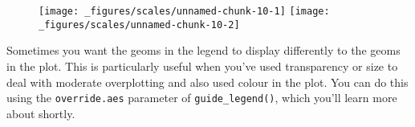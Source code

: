 \begin{Shaded}
\begin{Highlighting}[]
\OperatorTok{+}\StringTok{ }
\StringTok{  }\NormalTok{(} \NormalTok{, } \NormalTok{) }\OperatorTok{+}
\StringTok{  }\NormalTok{(}\NormalTok{(} \NormalTok{) }
\OperatorTok{+}\StringTok{ }
\StringTok{  }\NormalTok{(} \NormalTok{, } \NormalTok{, } \NormalTok{) }\OperatorTok{+}
\StringTok{  }\NormalTok{(}\NormalTok{(} \NormalTok{) }
\end{Highlighting}
\end{Shaded}

\begin{figure}[H]
  \texttt{[image: \_figures/scales/unnamed-chunk-10-1]}%
  \texttt{[image: \_figures/scales/unnamed-chunk-10-2]}
\end{figure}

Sometimes you want the geoms in the legend to display differently to the
geoms in the plot. This is particularly useful when you've used
transparency or size to deal with moderate overplotting and also used
colour in the plot. You can do this using the \texttt{override.aes}
parameter of \texttt{guide\_legend()}, which you'll learn more about
shortly. 

